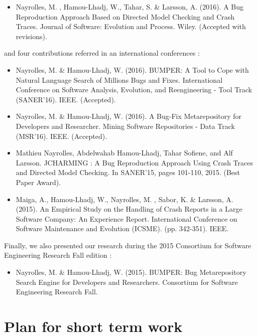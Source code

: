 \begin{itemize}
	\item Nayrolles, M. , Hamou-Lhadj, W., Tahar, S. & Larsson, A. (2016). A Bug Reproduction Approach Based on Directed Model Checking and Crash Traces. Journal of Software: Evolution and Process. Wiley. (Accepted with revisions).
\end{itemize}

and four contributions referred in an international conferences \cite{Nayrolles2015,Maiga2014,Nayrolles2016b, Nayrolles2016c}:

\begin{itemize}
	\item Nayrolles, M. \& Hamou-Lhadj, W. (2016). BUMPER: A Tool to Cope with Natural Language Search of Millions Bugs and Fixes. International Conference on Software Analysis, Evolution, and Reengineering - Tool Track (SANER'16). IEEE. (Accepted).
	\item Nayrolles, M. \& Hamou-Lhadj, W. (2016). A Bug-Fix Metarepository for Developers and Researcher. Mining Software Repositories - Data Track (MSR'16). IEEE. (Accepted).
	\item Mathieu Nayrolles, Abdelwahab Hamou-Lhadj, Tahar Sofiene, and Alf Larsson. JCHARMING : A Bug Reproduction Approach Using Crash Traces and Directed Model Checking. In SANER'15, pages 101-110, 2015. (Best Paper Award).
	\item Maiga, A., Hamou-Lhadj, W., Nayrolles, M. , Sabor, K. \& Larsson, A. (2015). An Empirical Study on the Handling of Crash Reports in a Large Software Company: An Experience Report. International Conference on Software Maintenance and Evolution (ICSME). (pp. 342-351). IEEE.
\end{itemize}

Finally, we also presented our research during the 2015 Consortium for Software Engineering Research Fall edition \cite{Nayrolles2015e}:

\begin{itemize}
	\item Nayrolles, M. \& Hamou-Lhadj, W. (2015). BUMPER: Bug Metarepository Search Engine for Developers and Researchers. Consortium for Software Engineering Research Fall.
\end{itemize}

\section{Plan for short term work\label{sec:planning}}

